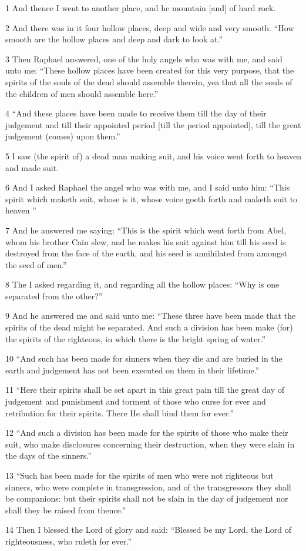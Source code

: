 \par 1 And thence I went to another place, and he mountain [and] of hard rock.
\par 2 And there was in it four hollow places, deep and wide and very smooth. “How smooth are the hollow places and deep and dark to look at.”
\par 3 Then Raphael answered, one of the holy angels who was with me, and said unto me: “These hollow places have been created for this very purpose, that the spirits of the souls of the dead should assemble therein, yea that all the souls of the children of men should assemble here.”
\par 4 “And these places have been made to receive them till the day of their judgement and till their appointed period [till the period appointed], till the great judgement (comes) upon them.”
\par 5 I saw (the spirit of) a dead man making suit, and his voice went forth to heaven and made suit.
\par 6 And I asked Raphael the angel who was with me, and I said unto him: “This spirit which maketh suit, whose is it, whose voice goeth forth and maketh suit to heaven ”
\par 7 And he answered me saying: “This is the spirit which went forth from Abel, whom his brother Cain slew, and he makes his suit against him till his seed is destroyed from the face of the earth, and his seed is annihilated from amongst the seed of men.”
\par 8 The I asked regarding it, and regarding all the hollow places: “Why is one separated from the other?”
\par 9 And he answered me and said unto me: “These three have been made that the spirits of the dead might be separated. And such a division has been make (for) the spirits of the righteous, in which there is the bright spring of water.”
\par 10 “And such has been made for sinners when they die and are buried in the earth and judgement has not been executed on them in their lifetime.”
\par 11 “Here their spirits shall be set apart in this great pain till the great day of judgement and punishment and torment of those who curse for ever and retribution for their spirits. There He shall bind them for ever.”
\par 12 “And such a division has been made for the spirits of those who make their suit, who make disclosures concerning their destruction, when they were slain in the days of the sinners.”
\par 13 “Such has been made for the spirits of men who were not righteous but sinners, who were complete in transgression, and of the transgressors they shall be companions: but their spirits shall not be slain in the day of judgement nor shall they be raised from thence.”
\par 14 Then I blessed the Lord of glory and said: “Blessed be my Lord, the Lord of righteousness, who ruleth for ever.”


